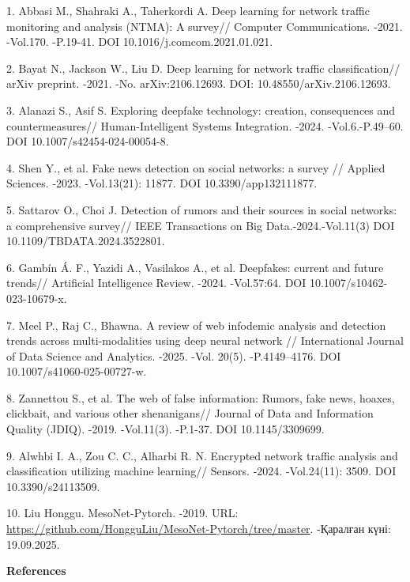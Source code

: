 \begin{refs}
1. Abbasi M., Shahraki A., Taherkordi A. Deep learning for network
traffic monitoring and analysis (NTMA): A survey// Computer
Communications. -2021. -Vol.170. -P.19-41. DOI
10.1016/j.comcom.2021.01.021.

2. Bayat N., Jackson W., Liu D. Deep learning for network traffic
classification// arXiv preprint. -2021. -No. arXiv:2106.12693. DOI:
10.48550/arXiv.2106.12693.

3. Alanazi S., Asif S. Exploring deepfake technology: creation,
consequences and countermeasures// Human-Intelligent Systems
Integration. -2024. -Vol.6.-P.49--60. DOI 10.1007/s42454-024-00054-8.

4. Shen Y., et al. Fake news detection on social networks: a survey //
Applied Sciences. -2023. -Vol.13(21): 11877. DOI
10.3390/app132111877.

5. Sattarov O., Choi J. Detection of rumors and their sources in social
networks: a comprehensive survey// IEEE Transactions on Big
Data.-2024.-Vol.11(3) DOI 10.1109/TBDATA.2024.3522801.

6. Gambín Á. F., Yazidi A., Vasilakos A., et al. Deepfakes: current and
future trends// Artificial Intelligence Review. -2024. -Vol.57:64.
DOI 10.1007/s10462-023-10679-x.

7. Meel P., Raj C., Bhawna. A review of web infodemic analysis and
detection trends across multi-modalities using deep neural network //
International Journal of Data Science and Analytics. -2025. -Vol.
20(5). -P.4149--4176. DOI 10.1007/s41060-025-00727-w.

8. Zannettou S., et al. The web of false information: Rumors, fake news,
hoaxes, clickbait, and various other shenanigans// Journal of Data and
Information Quality (JDIQ). -2019. -Vol.11(3). -P.1-37. DOI
10.1145/3309699.

9. Alwhbi I. A., Zou C. C., Alharbi R. N. Encrypted network traffic
analysis and classification utilizing machine learning// Sensors.
-2024. -Vol.24(11): 3509. DOI 10.3390/s24113509.

10. Liu Honggu. MesoNet-Pytorch. -2019. URL:
\url{https://github.com/HongguLiu/MesoNet-Pytorch/tree/master}.
-Қаралған күні: 19.09.2025.
\end{refs}

\begin{center}
{\bfseries References}
\end{center}

